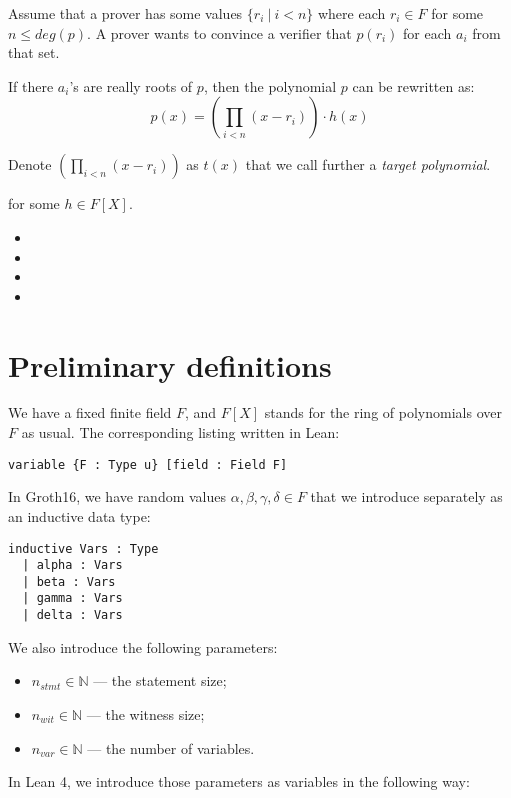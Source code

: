 \documentclass{article}
\theoremstyle{definition}
\theoremstyle{remark}
\begin{document}
Assume that a prover has some values $\{ r_i \: | \: i < n\}$ where each $r_i \in F$ for some $n \leq deg(p)$. A prover wants to convince a verifier that $p(r_i)$ for each $a_i$ from that set.

If there $a_i$'s are really roots of $p$, then the polynomial $p$ can be rewritten as:
\begin{equation}
p(x) = (\prod_{i < n} (x - r_i)) \cdot h(x)
\end{equation}

Denote $(\prod_{i < n} (x - r_i))$ as $t(x)$ that we call further a \emph{target polynomial}.

for some $h \in F[X]$.
\begin{itemize}
\item
\item
\item
\item
\end{itemize}


\section{Preliminary definitions}

We have a fixed finite field $F$, and $F[X]$ stands for the ring of polynomials over $F$ as usual. The corresponding listing written in Lean:

\begin{lstlisting}
variable {F : Type u} [field : Field F]
\end{lstlisting}

In Groth16, we have random values $\alpha, \beta, \gamma, \delta \in F$ that we introduce separately as an inductive data type:
\begin{lstlisting}
inductive Vars : Type
  | alpha : Vars
  | beta : Vars
  | gamma : Vars
  | delta : Vars
\end{lstlisting}

We also introduce the following parameters:

\begin{itemize}
\item $n_{stmt} \in \mathbb{N}$ --- the statement size;
\item $n_{wit} \in \mathbb{N}$ --- the witness size;
\item $n_{var} \in \mathbb{N}$ --- the number of variables.
\end{itemize}

In Lean 4, we introduce those parameters as variables in the following way:
\end{document}
